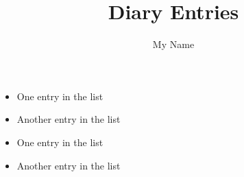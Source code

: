 \documentclass{report}
\title{Diary Entries}
\author{My Name}
\begin{document}
	\maketitle
	
	\begin{itemize}
		\item One entry in the list
		\item Another entry in the list
	\end{itemize}
	\begin{itemize}
		\item One entry in the list
		\item Another entry in the list
	\end{itemize}
\end{document}
